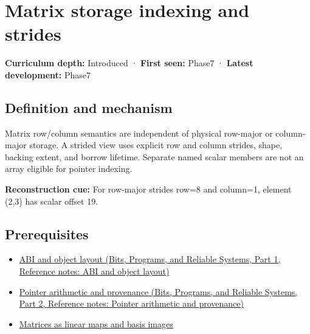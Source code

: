 \hypertarget{appendix-ffdc1d4e5350}{}\label{referencestart:appendix-ffdc1d4e5350}
\section{Matrix storage indexing and strides}\label{appendix-ffdc1d4e5350-matrix-storage-indexing-and-strides}

\hypertarget{appendix-ffdc1d4e5350-matrix-storage-indexing-and-strides}{}

\textbf{Curriculum depth:} Introduced · \textbf{First seen:} Phase7 · \textbf{Latest development:} Phase7

\begin{allmightroledefinition}

\subsection{Definition and mechanism}\label{appendix-ffdc1d4e5350-definition-and-mechanism}

\hypertarget{appendix-ffdc1d4e5350-definition-and-mechanism}{}

Matrix row/column semantics are independent of physical row-major or column-major storage. A strided view uses explicit row and column strides, shape, backing extent, and borrow lifetime. Separate named scalar members are not an array eligible for pointer indexing.

\end{allmightroledefinition}

\textbf{Reconstruction cue:} For row-major strides row=8 and column=1, element (2,3) has scalar offset 19.

\subsection{Prerequisites}\label{appendix-ffdc1d4e5350-prerequisites}

\hypertarget{appendix-ffdc1d4e5350-prerequisites}{}

\begin{itemize}
\tightlist
\item
  \href{../01-Bits-Programs-and-Reliable-Systems-P01/main.pdf\#appendix-c4ac6bb0fff8}{ABI and object layout (Bits, Programs, and Reliable Systems, Part 1, Reference notes: ABI and object layout)}
\item
  \href{../01-Bits-Programs-and-Reliable-Systems-P02/main.pdf\#appendix-6af5921bc853}{Pointer arithmetic and provenance (Bits, Programs, and Reliable Systems, Part 2, Reference notes: Pointer arithmetic and provenance)}
\item
  \hyperref[appendix-bd39c3bf5d64]{Matrices as linear maps and basis images}
\end{itemize}

